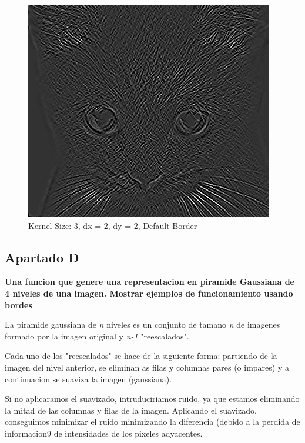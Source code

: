 \documentclass{article}
\begin{document}
\begin{minipage}{\linewidth}
    \centering
    \begin{minipage}{0.45\linewidth}
        \begin{figure}[H]
			\includegraphics[width=\linewidth]{Ejercicio2c/cat(3,2,2)_DEFAULT.png}             			
			\caption{Kernel Size: 3, dx = 2, dy = 2,  Default Border}
        \end{figure}
    \end{minipage}   
\end{minipage}

\subsection*{Apartado D}
\textbf{Una funcion que genere una representacion en piramide Gaussiana de 4 niveles de una imagen. Mostrar ejemplos de funcionamiento usando bordes}

La piramide gaussiana de \textit{n} niveles es un conjunto de tamano \textit{n} de imagenes formado por la imagen original y \textit{n-1} "reescalados".

Cada uno de los "reescalados" se hace de la siguiente forma: partiendo de la imagen del nivel anterior, se eliminan as filas y columnas pares (o impares) y a continuacion se suaviza la imagen (gaussiana).

Si no aplicaramos el suavizado, intruduciriamos ruido, ya que estamos eliminando la mitad de las columnas y filas de la imagen. Aplicando el suavizado, conseguimos minimizar el ruido minimizando la diferencia (debido a la perdida de informacion9 de intensidades de los pixeles adyacentes.
\end{document}
